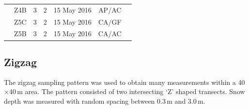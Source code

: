 \documentclass{sfuthesis}
\begin{document}
\begin{table}[]
\begin{tabular}{ccccccl}
                      & Z4B               & 3                                                               & 2                                                                             & 15 May 2016   & AP/AC              &                                                                              \\
                      & Z5C               & 3                                                               & 2                                                                             & 15 May 2016   & CA/GF              &                                                                              \\
                      & Z5B               & 3                                                               & 2                                                                             & 15 May 2016   & CA/AC              &                                                                             
\end{tabular}
\end{table}



\subsection{Zigzag}
\label{sec:zigzagmethods}

The zigzag sampling pattern was used to obtain many measurements within a 40$\times$40\,m area.  The pattern consisted of two intersecting `Z' shaped transects. Snow depth was measured with random spacing between 0.3\,m and 3.0\,m. 
\end{document}
